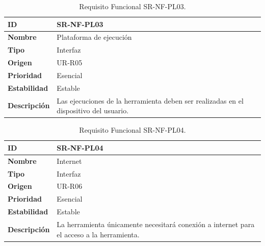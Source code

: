 \begin{center}
\begin{table}[htbp]
\centering
\begin{tabular}{@{}p{2.5cm} p{9cm}@{}} 
\toprule
\textbf{ID} 				& SR-NF-PL03 \\
\midrule
\textbf{Nombre} 			& Plataforma de ejecución \\
\midrule
\textbf{Tipo} 			& Interfaz \\
\midrule
\textbf{Origen} 			& UR-R05 \\
\midrule
\textbf{Prioridad}		& Esencial \\
\midrule
\textbf{Estabilidad} 		& Estable \\
\midrule
\textbf{Descripción} 	& Las ejecuciones de la herramienta deben ser realizadas en el dispositivo del usuario. \\
\bottomrule
\end{tabular}
\caption{Requisito Funcional SR-NF-PL03.}
\label{tab:srnfpl03}
\end{table}
\end{center}

\begin{center}
\begin{table}[htbp]
\centering
\begin{tabular}{@{}p{2.5cm} p{9cm}@{}} 
\toprule
\textbf{ID} 				& SR-NF-PL04 \\
\midrule
\textbf{Nombre} 			& Internet \\
\midrule
\textbf{Tipo} 			& Interfaz \\
\midrule
\textbf{Origen} 			& UR-R06 \\
\midrule
\textbf{Prioridad}		& Esencial \\
\midrule
\textbf{Estabilidad} 		& Estable \\
\midrule
\textbf{Descripción} 	& La herramienta únicamente necesitará conexión a internet para el acceso a la herramienta. \\
\bottomrule
\end{tabular}
\caption{Requisito Funcional SR-NF-PL04.}
\label{tab:srnfpl04}
\end{table}
\end{center}

